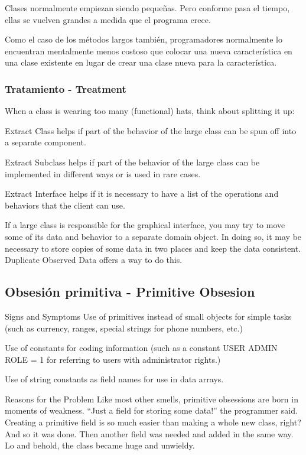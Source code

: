 \documentclass[11pt,a4paper,oneside]{book}
\begin{document}
Clases normalmente empiezan siendo pequeñas. Pero conforme pasa el tiempo, ellas se vuelven grandes a medida que el programa crece.

Como el caso de los métodos largos también, programadores normalmente lo encuentran mentalmente menos costoso que colocar una nueva característica en una clase existente en lugar de crear una clase nueva para la característica. 

\subsubsection{Tratamiento - Treatment}


When a class is wearing too many (functional) hats, think about splitting it up:


Extract Class helps if part of the behavior of the large class can be spun off into a separate component.

Extract Subclass helps if part of the behavior of the large class can be implemented in different ways or is used in rare cases.

Extract Interface helps if it is necessary to have a list of the operations and behaviors that the client can use.

If a large class is responsible for the graphical interface, you may try to move some of its data and behavior to a separate domain object. In doing so, it may be necessary to store copies of some data in two places and keep the data consistent. Duplicate Observed Data offers a way to do this.


\subsection{Obsesión primitiva - Primitive Obsesion}
\label{primitiveobsesion}
Signs and Symptoms
Use of primitives instead of small objects for simple tasks (such as currency, ranges, special strings for phone numbers, etc.)

Use of constants for coding information (such as a constant USER ADMIN ROLE = 1 for referring to users with administrator rights.)

Use of string constants as field names for use in data arrays.


Reasons for the Problem
Like most other smells, primitive obsessions are born in moments of weakness. “Just a field for storing some data!” the programmer said. Creating a primitive field is so much easier than making a whole new class, right? And so it was done. Then another field was needed and added in the same way. Lo and behold, the class became huge and unwieldy.
\end{document}
